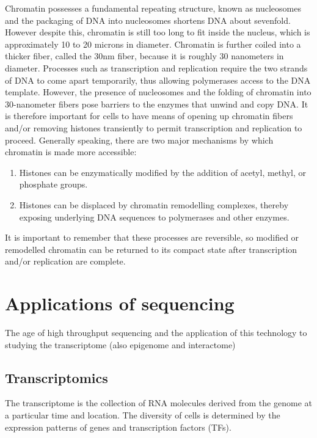 Chromatin possesses a fundamental repeating structure\cite{holde01111974}, known as nucleosomes and the packaging of DNA into nucleosomes shortens DNA about sevenfold. However despite this, chromatin is still too long to fit inside the nucleus, which is approximately 10 to 20 microns in diameter. Chromatin is further coiled into a thicker fiber, called the 30nm fiber, because it is roughly 30 nanometers in diameter. Processes such as transcription and replication require the two strands of DNA to come apart temporarily, thus allowing polymerases access to the DNA template. However, the presence of nucleosomes and the folding of chromatin into 30-nanometer fibers pose barriers to the enzymes that unwind and copy DNA. It is therefore important for cells to have means of opening up chromatin fibers and/or removing histones transiently to permit transcription and replication to proceed. Generally speaking, there are two major mechanisms by which chromatin is made more accessible:

\begin{enumerate}
   \item Histones can be enzymatically modified by the addition of acetyl, methyl, or phosphate groups.
   \item Histones can be displaced by chromatin remodelling complexes, thereby exposing underlying DNA sequences to polymerases and other enzymes.
\end{enumerate}

It is important to remember that these processes are reversible, so modified or remodelled chromatin can be returned to its compact state after transcription and/or replication are complete.

\section{Applications of sequencing}

The age of high throughput sequencing and the application of this technology to studying the transcriptome (also epigenome and interactome)

\subsection{Transcriptomics}

The transcriptome is the collection of RNA molecules derived from the genome at a particular time and location. The diversity of cells is determined by the expression patterns of genes and transcription factors (TFs).

